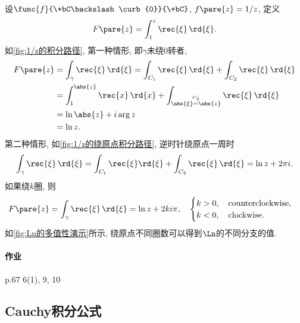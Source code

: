 \documentclass{ctexart}
\begin{document}
\begin{sample}
    \begin{ex}
        设$\func{f}{\+bC\backslash \curb{0}}{\+bC}$, $f\pare{z} =1/z$, 定义
        \[ F\pare{z} = \int_1^z \rec{\xi}\,\rd{\xi}. \]
        如\cref{fig:1/z的积分路径}, 第一种情形, 即$\gamma$未绕$0$转者,
        \begin{align*}
            F\pare{z} &= \int_\gamma \rec{\xi}\,\rd{\xi} = \int_{C_1} \rec{\xi}\,\rd{\xi} + \int_{C_2}\rec{\xi}\,\rd{\xi} \\
            &= \int_1^{\abs{z}} \rec{x}\,\rd{x} + \int_{\stackrel{C_2}{\abs{\xi}=\abs{z}}} \rec{\xi}\,\rd{\xi} \\
            &= \ln \abs{z} + i\arg z \\
            &= \ln z.
        \end{align*}
        第二种情形, 如\cref{fig:1/z的绕原点积分路径}, 逆时针绕原点一周时
        \[ \int_\gamma \rec{\xi}\,\rd{\xi} = \int_{C_1} \rec{\xi}\rd{\xi} + \int_{C_2} \rec{\xi}\,\rd{\xi} = \ln z + 2\pi i. \]
        如果绕$k$圈, 则
        \[ F\pare{z} = \int_\gamma \rec{\xi}\,\rd{\xi} = \ln z + 2ki\pi,\quad \begin{cases}
            k>0,\quad \mathrm{counterclockwise},\\
            k<0,\quad \mathrm{clockwise}.
        \end{cases} \]
        如\cref{fig:Ln的多值性演示}所示, 绕原点不同圈数可以得到$\Ln$的不同分支的值.
    \end{ex}
\end{sample}

\paragraph{作业} %
\label{par:作业}

p.67 6(1), 9, 10



\subsection{Cauchy积分公式} %
\label{sub:cauchy积分公式}
\end{document}

